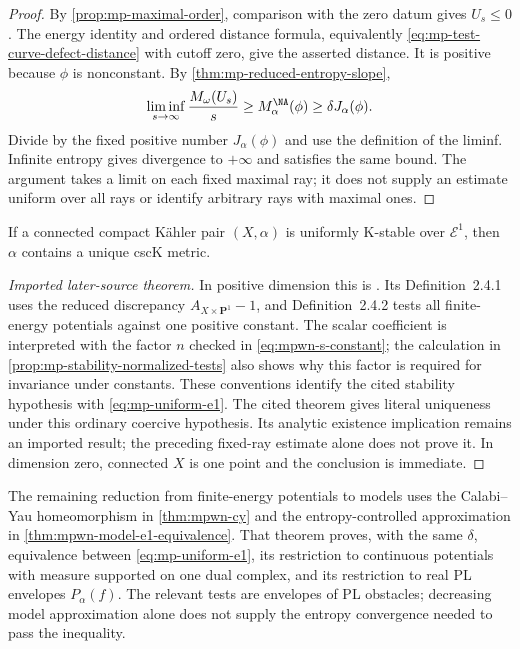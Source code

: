 \begin{proof}
By \cref{prop:mp-maximal-order}, comparison with the zero datum gives $U_s\leq0$. The energy identity and ordered distance formula, equivalently \eqref{eq:mp-test-curve-defect-distance} with cutoff zero, give the asserted distance. It is positive because $\phi$ is nonconstant. By \cref{thm:mp-reduced-entropy-slope},
\[
 \liminf_{s\to\infty}\frac{M_\omega(U_s)}s
       \geq M_\alpha^{\NA}(\phi)
       \geq\delta J_\alpha(\phi).
\]
Divide by the fixed positive number $J_\alpha(\phi)$ and use the definition of the liminf. Infinite entropy gives divergence to $+\infty$ and satisfies the same bound. The argument takes a limit on each fixed maximal ray; it does not supply an estimate uniform over all rays or identify arbitrary rays with maximal ones.
\end{proof}

\begin{theorem}\label{thm:mp-e1-stability-csck}
If a connected compact K\"ahler pair $(X,\alpha)$ is uniformly K-stable over $\mathcal E^1$, then $\alpha$ contains a unique cscK metric.
\end{theorem}

\begin{proof}[Imported later-source theorem]
In positive dimension this is \cite[Theorem~2.4.3, p.~13]{MPWN25}. Its Definition~2.4.1 uses the reduced discrepancy $A_{X\times\mathbf P^1}-1$, and Definition~2.4.2 tests all finite-energy potentials against one positive constant. The scalar coefficient is interpreted with the factor $n$ checked in \eqref{eq:mpwn-s-constant}; the calculation in \cref{prop:mp-stability-normalized-tests} also shows why this factor is required for invariance under constants. These conventions identify the cited stability hypothesis with \eqref{eq:mp-uniform-e1}. The cited theorem gives literal uniqueness under this ordinary coercive hypothesis. Its analytic existence implication remains an imported result; the preceding fixed-ray estimate alone does not prove it. In dimension zero, connected $X$ is one point and the conclusion is immediate.
\end{proof}

The remaining reduction from finite-energy potentials to models uses the Calabi--Yau homeomorphism in \cref{thm:mpwn-cy} and the entropy-controlled approximation in \cref{thm:mpwn-model-e1-equivalence}. That theorem proves, with the same $\delta$, equivalence between \eqref{eq:mp-uniform-e1}, its restriction to continuous potentials with measure supported on one dual complex, and its restriction to real PL envelopes $P_\alpha(f)$. The relevant tests are envelopes of PL obstacles; decreasing model approximation alone does not supply the entropy convergence needed to pass the inequality.

